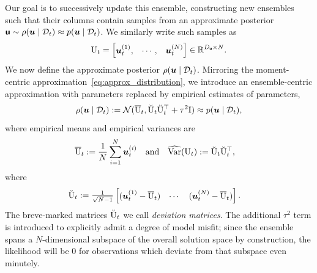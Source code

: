 \documentclass{article}
\theoremstyle{plain}
\theoremstyle{definition}
\theoremstyle{remark}
\begin{document}
Our goal is to successively update this ensemble, constructing new ensembles  such that their columns contain samples from an approximate posterior $\boldsymbol{\mathsf{u}} \sim \rho(\boldsymbol{u} \mid \mathcal{D}_t)\approx p(\boldsymbol{u} \mid \mathcal{D}_t)$. We similarly write such samples as
\begin{align*}
    \mathrm{U}_{t}=\begin{bmatrix}\boldsymbol{u}_{t}^{(1)}, & \cdots, & \boldsymbol{u}_{t}^{(N)} \end{bmatrix} \in \mathbb{R}^{D_{\boldsymbol{\mathsf{u}}}\times N}.
\end{align*}
We now define the approximate posterior $\rho(\boldsymbol{u} \mid \mathcal{D}_t)$.  Mirroring the moment-centric approximation~\eqref{eq:approx_distribution}, we introduce an ensemble-centric approximation  with parameters replaced by empirical estimates of parameters,
$$\rho(\boldsymbol{u} \mid \mathcal{D}_t) := \mathcal{N}(\overline{\mathrm{U}}_t,\breve{\mathrm{U}}_t\breve{\mathrm{U}}^{\top}_t+ \tau^2\mathrm{I}) \approx p(\boldsymbol{u} \mid \mathcal{D}_t), $$
where empirical means and empirical variances are
\begin{align*}    %
    \overline{\mm{U}}_t:=\frac{1}{N}\sum_{i=1}^N \forcingst^{(i)}_t\quad  \text{and} \quad
    \widehat{\var}(\mm{U}_t)&:=\breve{\mm{U}}_t\breve{\mm{U}}^{\top}_t,
\end{align*} where
\begin{align*}
\breve{\mathrm{U}}_t&:={\textstyle\frac{1}{\sqrt{N-1}}}\begin{bmatrix}
    (\boldsymbol{u}^{(1)}_t-\overline{\mathrm{U}}_t) & \cdots & (\boldsymbol{u}^{(N)}_t-\overline{\mathrm{U}}_t)
\end{bmatrix}.
\end{align*}
The breve-marked matrices \(\breve{\mathrm{U}}_t\) we call \emph{deviation matrices}.
The additional \(\tau^2\) term is introduced to explicitly admit a degree of model misfit;
since the ensemble spans a \(N\)-dimensional subspace of the overall solution space by construction, the likelihood will be 0 for observations which deviate from that subspace even minutely.
\end{document}
